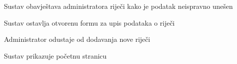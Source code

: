 \begin{packed_item}
\begin{packed_item}
\begin{packed_enum}
								\item Sustav obavještava administratora riječi kako je podatak neispravno unešen
								\item Sustav ostavlja otvorenu formu za upis podataka o riječi
								
							\end{packed_enum}
							
							\item[4.a] Administrator odustaje od dodavanja nove riječi
							\item[] \begin{packed_enum}
								
								\item Sustav prikazuje početnu stranicu
								
							\end{packed_enum}
							
						\end{packed_item}
					\end{packed_item}
				
